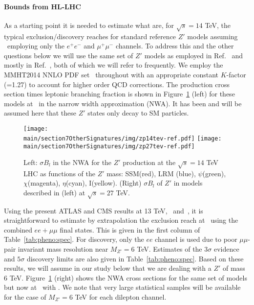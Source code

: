 \paragraph*{Bounds from HL-LHC}
As a starting point it is needed to estimate what are, for $\sqrt s=14$ TeV, the typical exclusion/discovery reaches for standard reference $Z'$ models assuming \intlumihllhc\ employing only the $e^+e^-$ and $\mu^+\mu^-$ channels. To address this and the other questions below we will use the same set of $Z'$ models as employed
in Ref.~\cite{Rizzo:2014xma} and mostly in Ref.~\cite{Han:2013mra}, both of which we will refer to frequently. We employ the MMHT2014 NNLO PDF set~\cite{Harland-Lang:2014zoa}
throughout with an appropriate constant $K$-factor (=1.27) to account for higher order QCD corrections. The production cross section times leptonic branching fraction is shown in Figure~\ref{fig:pheno:toy} (left) for these models at \sqrtslhc\ in the narrow width approximation (NWA). It has been and will be assumed here that these $Z'$ states only decay to SM particles.


\begin{figure}[htbp]
  \centering
    \texttt{[image: \\main/section7OtherSignatures/img/zp14tev-ref.pdf]}
    \texttt{[image: \\main/section7OtherSignatures/img/zp27tev-ref.pdf]}
    \caption{Left: $\sigma B_l$ in the NWA for the $Z'$ production at the $\sqrt s=14$ TeV LHC as functions of the $Z'$ mass: SSM(red), LRM (blue), $\psi$(green), $\chi$(magenta),
$\eta$(cyan), I(yellow). (Right) $\sigma B_l$ of $Z'$ in models described in (left) at $\sqrt s=27$ TeV.}
\label{fig:pheno:toy}
\end{figure}

Using the present ATLAS and CMS results at 13 TeV,~\cite{Aaboud:2017buh} and~\cite{Sirunyan:2018exx}, it is straightforward to estimate by extrapolation the
exclusion reach at \sqrtslhc\ using the combined $ee+\mu\mu$ final states. This is given in the first column of Table~\ref{tab:pheno:spec}. For discovery, only the $ee$ channel is used due to poor $\mu\mu$-pair invariant mass resolution near $M_{Z'}=6$ TeV. Estimates of the $3\sigma$ evidence and $5\sigma$
discovery limits are also given in Table~\ref{tab:pheno:spec}. Based on these results, we will assume in our study below that we are dealing with a $Z'$ of mass 6 TeV. Figure~\ref{fig:pheno:toy} (right) shows the NWA cross sections for the same set of models but now at \sqrtshelhc\ with \intlumihelhc. We note that very large statistical samples will be available for the case of $M_{Z'}=6$ TeV
for each dilepton channel.

